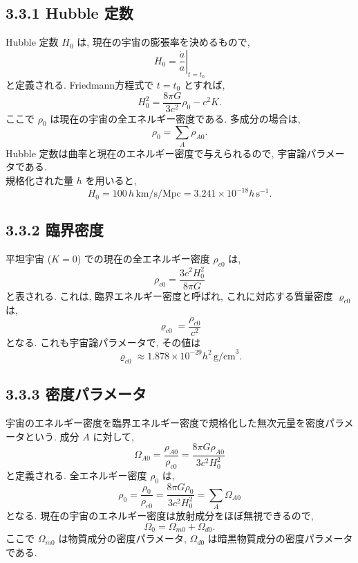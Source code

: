 \documentclass[a4paper,12pt]{article}
\begin{document}
\subsection*{3.3.1 Hubble 定数}
Hubble 定数 $H_0$ は, 現在の宇宙の膨張率を決めるもので,
\begin{equation*}
    H_0 = \left. \frac{\dot{a}}{a} \right|_{t = t_0} \tag{3.53}
\end{equation*}
と定義される. Friedmann方程式で $t = t_0$ とすれば,
\begin{equation*}
    H_0^2 = \frac{8 \pi G}{3c^2} \rho_{0} -c^2 K. \tag{3.54}
\end{equation*}
ここで $\rho_{0}$ は現在の宇宙の全エネルギー密度である. 多成分の場合は,
\begin{equation*}
    \rho_{0} = \sum_{A} \rho_{A0}. \tag{3.55}
\end{equation*}
Hubble 定数は曲率と現在のエネルギー密度で与えられるので, 宇宙論パラメータである.\\
規格化された量 $h$ を用いると,
\begin{equation*}
    H_0 = 100\, h\, \text{km/s/Mpc} = 3.241 \times 10^{-18} h\, \text{s}^{-1}. \tag{3.56}
\end{equation*}
\subsection*{3.3.2 臨界密度}
平坦宇宙 ($K = 0$) での現在の全エネルギー密度 $\rho_{c0}$ は,
\begin{equation*}
    \rho_{c0} = \frac{3 c^2H_0^2}{8 \pi G} \tag{3.57}
\end{equation*}
と表される. これは, 臨界エネルギー密度と呼ばれ, これに対応する質量密度 $\varrho_{c0}$ は,
\begin{equation*}
    \varrho_{c0} = \frac{\rho_{c0}}{c^2} \tag{3.58}
\end{equation*}
となる. これも宇宙論パラメータで, その値は
\begin{equation*}
    \varrho_{c0} \approx 1.878 \times 10^{-29} h^2\, \text{g/cm}^3. \tag{3.59}
\end{equation*}
\subsection*{3.3.3 密度パラメータ}
宇宙のエネルギー密度を臨界エネルギー密度で規格化した無次元量を密度パラメータという. 成分 $A$ に対して,
\begin{equation*}
    \Omega_{A0} = \frac{\rho_{A0}}{\rho_{c0}} = \frac{8\pi G\rho_{A0}}{3c^2 H_0^2} \tag{3.60}
\end{equation*}
と定義される. 全エネルギー密度 $\rho_{0}$ は,
\begin{equation*}
    \rho_{0} = \frac{\rho_{0}}{\rho_{c0}} = \frac{8\pi G\rho_{0}}{3c^2 H_0^2} = \sum_{A} \Omega_{A0} \tag{3.61}
\end{equation*}
となる. 現在の宇宙のエネルギー密度は放射成分をほぼ無視できるので,
\begin{equation*}
    \Omega_0 = \Omega_{m0} +  \Omega_{d0}. \tag{3.62}
\end{equation*}
ここで $\Omega_{m0}$ は物質成分の密度パラメータ, $\Omega_{d0}$ は暗黒物質成分の密度パラメータである. 
\end{document}
